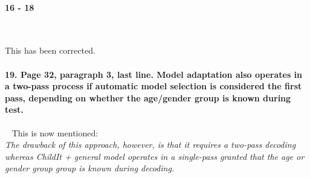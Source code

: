 \documentclass[]{article}
\begin{document}
\paragraph{16 - 18}

~

This has been corrected.

\paragraph{19. Page 32, paragraph 3, last line. Model adaptation also operates in a two-pass process if automatic model selection is considered the first pass, depending on whether the age/gender group is known during test.}

~
This is now mentioned:\\
\textit{The drawback of this approach, however, is that it requires a two-pass decoding whereas {\em ChildIt + general model} operates in a single-pass granted that the age or gender group group is known during decoding.}
\end{document}
